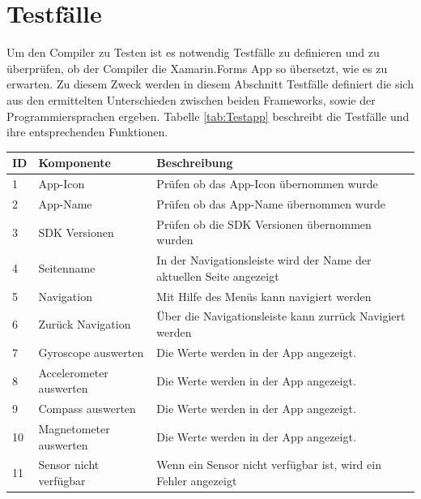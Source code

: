 \section{Testfälle}
Um den Compiler zu Testen ist es notwendig Testfälle zu definieren und zu überprüfen, ob der Compiler die Xamarin.Forms App so übersetzt, wie es zu erwarten.   Zu diesem Zweck werden in diesem Abschnitt Testfälle definiert die sich aus den ermittelten Unterschieden zwischen beiden Frameworks,  sowie der Programmiersprachen ergeben.  Tabelle \ref{tab:Testapp} beschreibt die Testfälle und ihre entsprechenden Funktionen.

\newpage

\begin{table}[!ht]
\begin{tabularx}{\textwidth}{l|l|X}
   \textbf{ID} & \textbf{Komponente} & \textbf{Beschreibung} \\
\hline
1             & App-Icon           	& Prüfen ob das App-Icon übernommen wurde                      			 \\ 
2             & App-Name          	& Prüfen ob das App-Name übernommen wurde                      		 \\ 
3             & SDK Versionen      & Prüfen ob die SDK Versionen übernommen wurden                      \\ 
4             & Seitenname           				& In der Navigationsleiste wird der Name der aktuellen Seite angezeigt                      			 \\ 
5          	  & Navigation         			  	& Mit Hilfe des Menüs kann navigiert werden                      			 \\ 
6             & Zurück Navigation           	& Über die Navigationsleiste kann zurrück Navigiert werden                      			 \\ 
7             & Gyroscope auswerten           	& Die Werte werden in der App angezeigt.                      			 \\ 
8             & Accelerometer auswerten           	& Die Werte werden in der App angezeigt.                   			 \\ 
9             & Compass auswerten           	& Die Werte werden in der App angezeigt.                			 \\ 
10            & Magnetometer auswerten           	& Die Werte werden in der App angezeigt.                			 \\ 
11            & Sensor nicht verfügbar           	& Wenn ein Sensor nicht verfügbar ist, wird ein Fehler angezeigt          			 \\ 

\end{tabularx}
\end{table}
